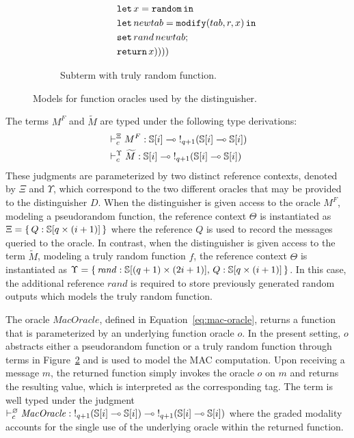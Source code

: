 \begin{figure}[htpb]
{\begin{subfigure}[c]{0.45\textwidth}
\begin{align*}
\begin{aligned}
            &\quad\quad \mathtt{let}\,x=\mathtt{random}\,\mathtt{in}\, \\
            &\quad\quad \mathtt{let}\,newtab=\mathtt{modify}(tab, r, x)\,\mathtt{in}\, \\
            &\quad\quad \mathtt{set}\,rand\,newtab; \\
            &\quad\quad \mathtt{return}\, x))))
        \end{aligned}
        \end{align*}
        \caption{Subterm with truly random function.}
        \label{subfig:oracle-truly-random}
    \end{subfigure}
    \caption{Models for function oracles used by the distinguisher.}
    \label{fig:oracles}
}
\end{figure}

The terms $M^F$ and $\widetilde{M}$ are typed under the following type derivations:
\begin{align*}
&\vdash_c^\Xi M^F: \mathbb{S}[i] \multimap \mathord{!}_{q+1}(\mathbb{S}[i] \multimap \mathbb{S}[i]) \\
&\vdash_c^\Upsilon \widetilde{M}: \mathbb{S}[i] \multimap \mathord{!}_{q+1}(\mathbb{S}[i] \multimap \mathbb{S}[i])
\end{align*}
These judgments are parameterized by two distinct reference contexts, denoted by $\Xi$ and $\Upsilon$, which correspond to the two different oracles that may be provided to the distinguisher $D$. When the distinguisher is given access to the oracle $M^F$, modeling a pseudorandom function, the reference context $\Theta$ is instantiated as $\Xi = \{\, Q : \mathbb{S}[q \times (i+1)] \,\}$ where the reference $Q$ is used to record the messages queried to the oracle. In contrast, when the distinguisher is given access to the term $\widetilde{M}$, modeling a truly random function $f$, the reference context $\Theta$ is instantiated as $\Upsilon = \{\, \mathit{rand} : \mathbb{S}[(q+1) \times (2i+1)],\, Q : \mathbb{S}[q \times (i+1)] \,\}$. In this case, the additional reference $\mathit{rand}$ is required to store previously generated random outputs which models the truly random function.

The oracle $\mathit{MacOracle}$, defined in Equation~\ref{eq:mac-oracle}, returns a function that is parameterized by an underlying function oracle $o$. In the present setting, $o$ abstracts either a pseudorandom function or a truly random function through terms in Figure~\ref{fig:oracles} and is used to model the MAC computation. Upon receiving a message $m$, the returned function simply invokes the oracle $o$ on $m$ and returns the resulting value, which is interpreted as the corresponding tag.  The term is well typed under the judgment $\vdash_c^\varnothing \mathit{MacOracle}: \mathord{!}_{q+1}(\mathbb{S}[i] \multimap \mathbb{S}[i]) \multimap \mathord{!}_{q+1}(\mathbb{S}[i] \multimap \mathbb{S}[i])$ where the graded modality accounts for the single use of the underlying oracle within the returned function.

